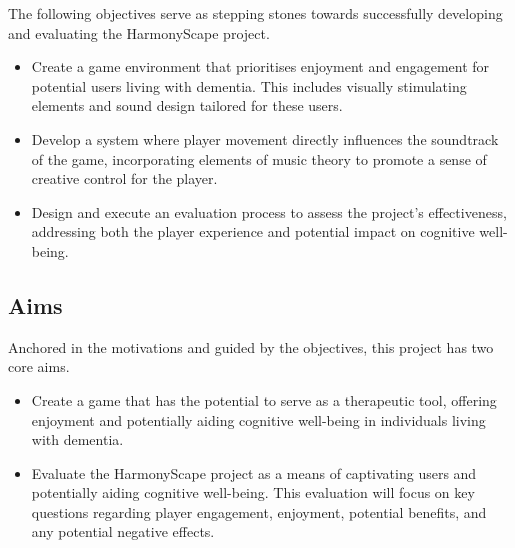 \documentclass{l4proj}
\begin{document}
The following objectives serve as stepping stones towards successfully developing and evaluating the HarmonyScape project.

\begin{itemize}
    \item Create a game environment that prioritises enjoyment and engagement for potential users living with dementia. This includes visually stimulating elements and sound design tailored for these users.
    \item Develop a system where player movement directly influences the soundtrack of the game, incorporating elements of music theory to promote a sense of creative control for the player.
    \item Design and execute an evaluation process to assess the project's effectiveness, addressing both the player experience and potential impact on cognitive well-being.
\end{itemize}

\subsection{Aims}

Anchored in the motivations and guided by the objectives, this project has two core aims.

\begin{itemize}
    \item Create a game that has the potential to serve as a therapeutic tool, offering enjoyment and potentially aiding cognitive well-being in individuals living with dementia.
    \item Evaluate the HarmonyScape project as a means of captivating users and potentially aiding cognitive well-being. This evaluation will focus on key questions regarding player engagement, enjoyment, potential benefits, and any potential negative effects.
\end{itemize}



\end{document}
